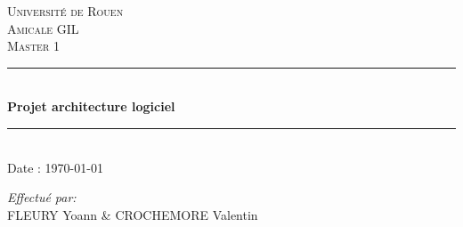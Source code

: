 \documentclass[12pt]{article}
\begin{document}
\begin{titlepage}

\newcommand{\HRule}{\rule{\linewidth}{0.5mm}} %

\center %


\textsc{\LARGE Université de Rouen}\\[1.5cm]
\textsc{\Large Amicale GIL}\\[0.5cm]
\textsc{\large Master 1}\\[0.5cm]


\HRule \\[0.4cm]
{ \huge \bfseries Projet architecture logiciel}\\[0.2cm] %
\HRule \\[1.5cm]
  


  {\large Date : \today}\\
  
  
  \vfill %
  
  \begin{minipage}{0.6\textwidth} \large
  	\begin{flushleft}
  		\emph{Effectué par:} \\
  		\textsc{FLEURY} Yoann \& \textsc{CROCHEMORE} Valentin
  	\end{flushleft}
  \end{minipage}\\[2cm]


  
\end{titlepage}
\end{document}
